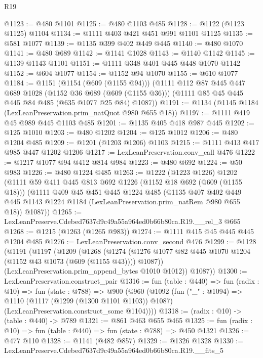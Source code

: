 \begin{lexlean}{R19}
\begin{coremodule}
@1123 := @480 @1101
@1125 := @480 @1103 @485
@1128 := @1122 (@1123 @1125) @1104
@1134 := @1111 @403 @421 @451 @991 @1101 @1125
@1135 := @581 @1077
@1139 := @1135 @399 @402 @449 @445
@1140 := @480 @1070
@1141 := @480 @689
@1142 := @1141 @1028
@1143 := @1140 @1142
@1145 := @1139 @1143 @1101
@1151 := @1111 @348 @401 @445 @448 @1070 @1142
@1152 := @604 @1077
@1154 := @1152 @94 @1070
@1155 := @610 @1077
@1184 := @1151
    (@1154 (@609 (@1155 @94)))
    (@1111
      @112
      @87
      @445
      @447
      @689
      @1028
      (@1152 @36 @689 (@609 (@1155 @36)))
      (@1111 @85 @45 @445 @445 @84 @485 (@635 @1077 @25 @84) @1087))
@1191 := @1134 (@1145 @1184 (LexLeanPreservation.prim_natQuot @980 @655 @18))
@1197 := @1111 @419 @45 @989 @445 @1103 @485
@1201 := @1135 @405 @418 @987 @445
@1202 := @125 @1010
@1203 := @480 @1202
@1204 := @125 @1012
@1206 := @480 @1204 @485
@1209 := @1201 (@1203 @1206) @1103
@1215 := @1111 @413 @417 @985 @447 @1202 @1206
@1217 := LexLeanPreservation.conv_call @476
@1222 := @1217 @1077 @94 @412 @814 @984
@1223 := @480 @692
@1224 := @50 @983
@1226 := @480 @1224 @485
@1263 := @1222
    (@1223 @1226)
    @1202
    (@1111
      @59
      @411
      @445
      @813
      @692
      @1226
      (@1152 @18 @692 (@609 (@1155 @18)))
      (@1111
        @409
        @45
        @451
        @445
        @1224
        @485
        (@1135
          @407
          @402
          @449
          @445
          @1143
          @1224
          @1184
          (LexLeanPreservation.prim_natRem @980 @655 @18))
        @1087))
@1265 := LexLeanPreserve.Cdebed7637d9c49a55a964ed0b66b80ca.R19.__rel_3 @665
@1268 := @1215 (@1263 (@1265 @983))
@1274 := @1111 @415 @45 @445 @445 @1204 @485
@1276 := LexLeanPreservation.conv_second @476
@1299 := @1128
    (@1191
      (@1197
        (@1209
          (@1268
            (@1274 (@1276 @1077 @82 @445 @1070 @1204 (@1152 @43 @1073 (@609 (@1155 @43)))) @1087))
          (LexLeanPreservation.prim_append_bytes @1010 @1012))
        @1087))
@1300 := LexLeanPreservation.construct_pair
@1316 := fun (table : @440) =>
  fun (radix : @10) =>
  fun (state : @788) =>
  @900
    (@960
      (@1092
        (fun ("_" : @1094) =>
        @1110
          (@1117 (@1299 (@1300 @1101 @1103)) @1087)
          (LexLeanPreservation.construct_some @1104))))
@1318 := (radix : @10) -> (table : @440) -> @789
@1321 := @861 @463 @655 @465
@1325 := fun (radix : @10) => fun (table : @440) => fun (state : @788) => @450 @1321
@1326 := @477 @110
@1328 := @1141 (@482 @857)
@1329 := @1326 @1328
@1330 := LexLeanPreserve.Cdebed7637d9c49a55a964ed0b66b80ca.R19.__fits_5

\end{coremodule}
\end{lexlean}
